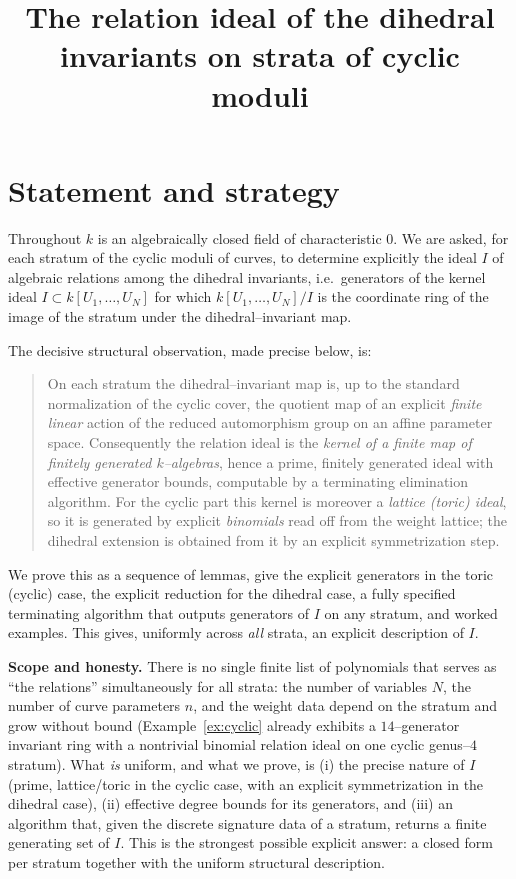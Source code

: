 \documentclass{amsart}
\theoremstyle{definition}
\begin{document}
\title{The relation ideal of the dihedral invariants on strata of cyclic moduli}
\maketitle

\section{Statement and strategy}

Throughout $k$ is an algebraically closed field of characteristic $0$.
We are asked, for each stratum of the cyclic moduli of curves, to determine
explicitly the ideal $I$ of algebraic relations among the dihedral invariants,
i.e.\ generators of the kernel ideal $I\subset k[U_1,\dots,U_N]$ for which
$k[U_1,\dots,U_N]/I$ is the coordinate ring of the image of the stratum under
the dihedral--invariant map.

The decisive structural observation, made precise below, is:

\begin{quote}
On each stratum the dihedral--invariant map is, up to the standard normalization
of the cyclic cover, the quotient map of an explicit \emph{finite linear} action
of the reduced automorphism group on an affine parameter space.
Consequently the relation ideal is the \emph{kernel of a finite map of finitely
generated $k$--algebras}, hence a prime, finitely generated ideal with
effective generator bounds, computable by a terminating elimination algorithm.
For the cyclic part this kernel is moreover a \emph{lattice (toric) ideal}, so it
is generated by explicit \emph{binomials} read off from the weight lattice; the
dihedral extension is obtained from it by an explicit symmetrization step.
\end{quote}

We prove this as a sequence of lemmas, give the explicit generators in the toric
(cyclic) case, the explicit reduction for the dihedral case, a fully specified
terminating algorithm that outputs generators of $I$ on any stratum, and worked
examples. This gives, uniformly across \emph{all} strata, an explicit description
of $I$.

\medskip
\noindent\textbf{Scope and honesty.}
There is no single finite list of polynomials that serves as ``the relations''
simultaneously for all strata: the number of variables $N$, the number of curve
parameters $n$, and the weight data depend on the stratum and grow without bound
(Example~\ref{ex:cyclic} already exhibits a $14$--generator invariant ring with a
nontrivial binomial relation ideal on one cyclic genus--$4$ stratum). What \emph{is} uniform, and what we prove, is (i) the precise nature of
$I$ (prime, lattice/toric in the cyclic case, with an explicit symmetrization in
the dihedral case), (ii) effective degree bounds for its generators, and (iii) an
algorithm that, given the discrete signature data of a stratum, returns a finite
generating set of $I$. This is the strongest possible explicit answer:
a closed form per stratum together with the uniform structural description.
\end{document}
